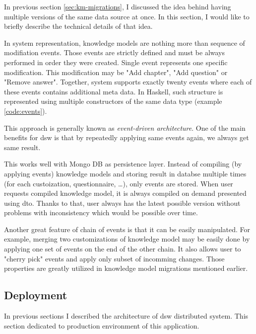 In previous section \ref{sec:km-migrations}, I discussed the idea behind having multiple versions of the same data source at once.
In this section, I would like to briefly describe the technical details of that idea.

In system representation, knowledge models are nothing more than sequence of modifiation events.
Those events are strictly defined and must be always performed in order they were created.
Single event represents one specific modification.
This modification may be "Add chapter", "Add question" or "Remove answer".
Together, system supports exactly twenty events where each of these events contains additional meta data.
In Haskell, such structure is represented using multiple constructors of the same data type (example \ref{code:events}).


This approach is generally known as \textit{event-driven architecture}\cite{mdm-event-architecture}.
One of the main benefits for \gls{dsw} is that by repeatedly applying same events again, we always get same result.

This works well with Mongo DB as persistence layer.
Instead of compiling (by applying events) knowledge models and storing result in databse multiple times (for each custoization, questionnaire, \dots), only events are stored.
When user requests compiled knowledge model, it is always compiled on demand presented using dto.
Thanks to that, user always has the latest possible version without problems with inconsistency which would be possible over time.

Another great feature of chain of events is that it can be easily manipulated.
For example, merging two customizations of knowledge model may be easily done by applying one set of events on the end of the other chain.
It also allows user to "cherry pick" events and apply only subset of incomming changes.
Those properties are greatly utilized in knowledge model migrations mentioned earlier.

\subsection{Deployment}

In previous sections I described the architecture of \gls{dsw} distributed system.
This section dedicated to production environment of this application.

